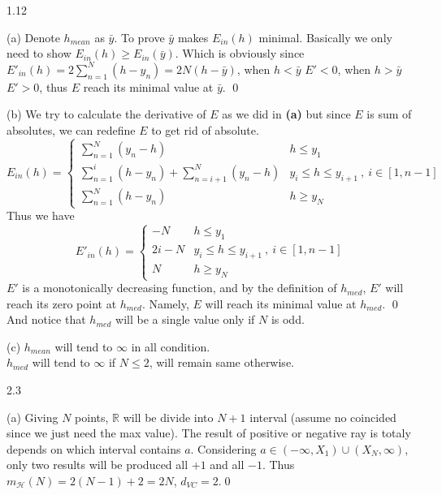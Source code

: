 \documentclass{article}
\begin{document}
\maketitle
\begin{tlist}{5}
	\item[1.12]
	\begin{tlist}{4}
		\item[(a)]
		Denote $h_{mean}$ as $\bar{y}$. To prove $\bar{y}$ makes $E_{in}(h)$ minimal. Basically we only need to show $E_{in}(h) \geq E_{in}(\bar{y})$. Which is obviously since $E'_{in}(h)=2\sum^N_{n=1}(h-y_n)=2N(h-\bar{y})$, when $h<\bar{y}$ $E'<0$, when $h>\bar{y}$ $E'>0$, thus $E$ reach its minimal value at $\bar{y}$. \qed
		\item[(b)]
		We try to calculate the derivative of $E$ as we did in \textbf{(a)} but since $E$ is sum of absolutes, we can redefine $E$ to get rid of absolute.
		$$E_{in}(h)=\begin{cases}
				\sum_{n=1}^N (y_n-h)
				 & h \leq y_1                                \\
				\sum_{n=1}^i (h-y_n) + \sum_{n=i+1}^N (y_n-h)
				 & y_{i} \leq h \leq y_{i+1}\ ,\ i\in[1,n-1] \\
				\sum_{n=1}^N (h-y_n)
				 & h \geq y_N
			\end{cases}$$
		Thus we have
		$$E'_{in}(h)=\begin{cases}
				-N   & h \leq y_1                                \\
				2i-N & y_{i} \leq h \leq y_{i+1}\ ,\ i\in[1,n-1] \\
				N    & h \geq y_N
			\end{cases}$$
		$E'$ is a monotonically decreasing function, and by the definition of $h_{med}$, $E'$ will reach its zero point at $h_{med}$. Namely, $E$ will reach its minimal value at $h_{med}$. \qed\\
		And notice that $h_{med}$ will be a single value only if $N$ is odd.
		\item[(c)]
		$h_{mean}$ will tend to $\infty$ in all condition.\\
		$h_{med}$ will tend to $\infty$ if $N \leq 2$, will remain same otherwise.
	\end{tlist}
	\item[2.3]
	\begin{tlist}{4}
		\item[(a)]
		Giving $N$ points, $\mathbb{R}$ will be divide into $N+1$ interval (assume no coincided since we just need the max value). The result of positive or negative ray is totaly depends on which interval contains $a$. Considering $a\in (-\infty,X_1)\cup (X_N,\infty)$, only two results will be produced all $+1$ and all $-1$. Thus $m_{\mathcal{H}}(N)=2(N-1)+2=2N$, $d_{VC}=2$.\qed

\end{tlist}
\end{tlist}
\end{document}
